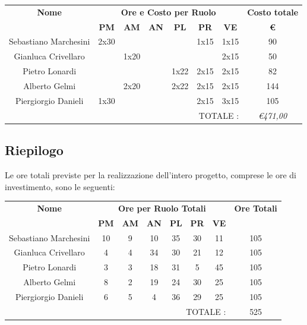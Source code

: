 \documentclass[12pt,a4paper,titlepage]{article}
\begin{document}
{\renewcommand\arraystretch{1.2} %
	\begin{tabular}{|c|c|c|c|c|c|c|c|}
		\hline 
		\textbf{Nome} & \multicolumn{6}{c|}{\textbf{Ore e Costo per Ruolo}} & \textbf{Costo totale} \\ 
		& \textbf{PM} & \textbf{AM} & \textbf{AN} & \textbf{PL} & \textbf{PR} & \textbf{VE} & \textbf{ \euro } \\ 
		\hline
		Sebastiano Marchesini & 2x30 & & & & 1x15 & 1x15 & 90 \\ 
		\hline 
		Gianluca Crivellaro & & 1x20 & & & & 2x15 & 50 \\ 
		\hline 
		Pietro Lonardi & & & & 1x22 & 2x15 & 2x15 & 82 \\ 
		\hline 
		Alberto Gelmi & & 2x20 & & 2x22 & 2x15 & 2x15 & 144 \\ 
		\hline 
		Piergiorgio Danieli & 1x30 & & & & 2x15 & 3x15 & 105 \\ 
		\hline 
		\multicolumn{7}{r|}{TOTALE :} & \textit{\euro 471,00} \\ 
\end{tabular}} 

\subsection{Riepilogo}
Le ore totali previste per la realizzazione dell'intero progetto, comprese le ore di investimento, sono le seguenti: \\

{\renewcommand\arraystretch{1.2} %
	\begin{tabular}{|c|c|c|c|c|c|c|c|}
			\hline 
		\textbf{Nome} & \multicolumn{6}{c|}{\textbf{Ore per Ruolo Totali}} & \textbf{Ore Totali} \\ 
		& \textbf{PM} & \textbf{AM} & \textbf{AN} & \textbf{PL} & \textbf{PR} & \textbf{VE} & \\ 
		\hline
		Sebastiano Marchesini	& 10 & 9 & 10 & 35 & 30 & 11 & 105 \\ 
		\hline 
		Gianluca Crivellaro 	& 4 & 4 & 34 & 30 & 21 & 12 & 105 \\ 
		\hline 
		Pietro Lonardi 			& 3 & 3 & 18 & 31 & 5 & 45 & 105 \\ 
		\hline 
		Alberto Gelmi 			& 8 & 2 & 19 & 24 & 30 & 25 & 105 \\ 
		\hline 
		Piergiorgio Danieli 	& 6 & 5 & 4 & 36 & 29 & 25 & 105 \\ 
		\hline 
		\multicolumn{7}{r|}{TOTALE :} & 525 \\ 
\end{tabular}} 
\end{document}
